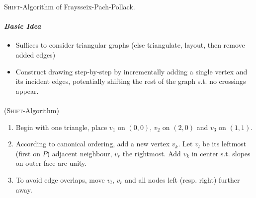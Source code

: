 \documentclass[10pt,twocolumn]{article}
\begin{document}
\textsc{Shift}-Algorithm of {Fraysseix-Pach-Pollack}.

\paragraph{\textit{Basic Idea}}
\begin{itemize}
\item Suffices to consider triangular graphs (else triangulate, layout, then
  remove added edges)
\item Construct drawing step-by-step by incrementally adding a single vertex and
  its incident edges, potentially shifting the rest of the graph s.t. no
  crossings appear.
\end{itemize}

\paragraph{ } (\textsc{Shift}-Algorithm)
\begin{enumerate}
\item Begin with one triangle, place $v_1$ on $(0,0)$, $v_2$ on $(2,0)$ and $v_3$
  on $(1,1)$. 
\item According to canonical ordering, add a new vertex $v_k$. Let $v_l$ be its
  leftmost (first on $P$) adjacent neighbour, $v_r$ the rightmost. Add $v_k$ in
  center s.t. slopes on outer face are unity.
\item To avoid edge overlaps, move $v_l$, $v_r$ and all nodes left (resp. right)
  further away. 
\end{enumerate}
\end{document}
